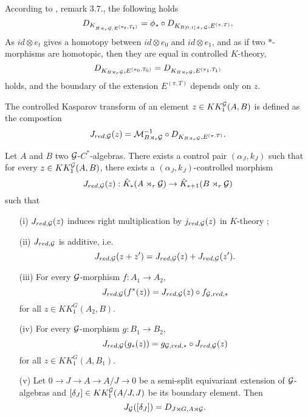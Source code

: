 According to \cite{OY2}, remark $3.7.$, the following holds
\[D_{K_{B\rtimes_r\mathcal G,E^{(\pi_t,T_t)}}} = \phi_* \circ D_{K_{B[0,1]\rtimes_r\mathcal G},E^{(\pi,T)}}.\]
As $id \otimes e_t$ gives a homotopy between $id\otimes e_0$ and $id\otimes e_1$, and as if two $*$-morphisms are homotopic, then they are equal in controlled $K$-theory, 
\[D_{K_{B\rtimes_r \mathcal G}, E^{(\pi_0,T_0)}}=D_{K_{B\rtimes_r \mathcal G}, E^{(\pi_1,T_1)}}\]
holds, and the boundary of the extension $E^{(\pi,T)}$ depends only on $z$.\\

\begin{definition}
The controlled Kasparov transform of an element $z\in KK_1^\mathcal G(A,B)$ is defined as the compostion
\[J_{red,\mathcal G}(z)=\mathcal M_{B\rtimes_r \mathcal G}^{-1}\circ D_{K_{B\rtimes_r \mathcal G}, E^{(\pi,T)}}.\]
\end{definition}

\begin{prop}\label{Kasparov1}
Let $A$ and $B$ two $\mathcal G$-$C^*$-algebras. There exists a control pair $(\alpha_J,k_J)$ such that for every $z\in KK^\mathcal G_1(A,B)$, there exists a $(\alpha_J,k_J)$-controlled morphism
\[J_{red,\mathcal G}(z) : \hat K_*(A\rtimes_r \mathcal G)\rightarrow \hat K_{*+1}(B\rtimes_r \mathcal G)\]
such that
\begin{enumerate}
\item[(i)] $J_{red,\mathcal G}(z)$ induces right multiplication by $j_{red,\mathcal G}(z)$ in $K$-theory ;
\item[(ii)] $J_{red,\mathcal G}$ is additive, i.e.
\[J_{red,\mathcal G}(z+z')=J_{red,\mathcal G}(z)+J_{red,\mathcal G}(z').\]
\item[(iii)] For every $\mathcal G$-morphism $f : A_1\rightarrow A_2$,
\[J_{red,\mathcal G}(f^*(z))=J_{red,\mathcal G}(z)\circ f_{\mathcal G,red,*}\] for all $z\in KK_1^G(A_2,B)$.
\item[(iv)] For every $\mathcal G$-morphism $g : B_1\rightarrow B_2$,
\[J_{red,\mathcal G}(g_*(z))= g_{\mathcal G,red,*}\circ J_{red,\mathcal G}(z)\] for all $z\in KK_1^G(A,B_1)$.
\item[(v)] Let $0\rightarrow J\rightarrow A\rightarrow A/J\rightarrow 0$ be a semi-split equivariant extension of $\mathcal G$-algebras and $[\delta_J]\in KK_1^\mathcal G(A/J,J)$ be its boundary element. Then 
\[J_\mathcal G([\delta_J])=D_{J\rtimes G,A\rtimes\mathcal G}.\] 
\end{enumerate}
\end{prop}

